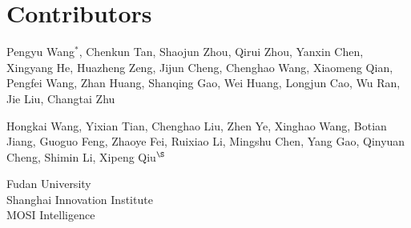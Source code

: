 \section*{Contributors}\label{sec:contributions}

\par\nopagebreak\noindent
Pengyu Wang$^{*}$,
Chenkun Tan,
Shaojun Zhou,
Qirui Zhou,
Yanxin Chen,
Xingyang He,
Huazheng Zeng,
Jijun Cheng,
Chenghao Wang,
Xiaomeng Qian,
Pengfei Wang,
Zhan Huang,
Shanqing Gao,
Wei Huang,
Longjun Cao,
Wu Ran,
Jie Liu,
Changtai Zhu

\medskip
{}\par\nopagebreak\noindent
Hongkai Wang,
Yixian Tian,
Chenghao Liu,
Zhen Ye,
Xinghao Wang,
Botian Jiang,
Guoguo Feng,
Zhaoye Fei,
Ruixiao Li,
Mingshu Chen,
Yang Gao,
Qinyuan Cheng,
Shimin Li,
Xipeng Qiu$^{\S}$

\medskip
{}\par\nopagebreak\noindent
Fudan University\\
Shanghai Innovation Institute\\
MOSI Intelligence

{\let\thefootnote\relax
{}}
